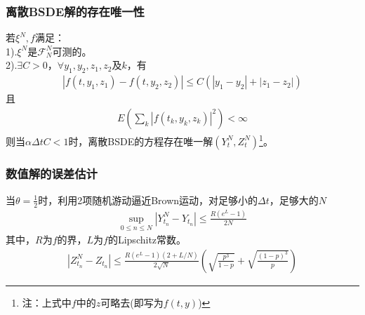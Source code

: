 		\subsubsection{离散BSDE解的存在唯一性}
			若${\xi}^N,f$满足：\\
			1).${\xi}^N$是${{\mathcal{F}}_N^N}$可测的。\\
			2).$\exists C>0$，$\forall y_1,y_2,z_1,z_2$及$k$，有
			\begin{align*}
			\left| {f\left( {t,y_1,{z_1}} \right) - f\left( {t,y_2,{z_2}} \right)} \right| \leqslant C\left( {\left| {{y_1} - {y_2}} \right| + \left| {{z_1} - {z_2}} \right|} \right)
			\end{align*}
			且\begin{align*}
			E\left( {\sum\limits_k {{{\left| {f\left( {{t_k},{y_k},{z_k}} \right)} \right|}^2}} } \right) < \infty
			\end{align*}
			则当$\alpha \Delta tC <1$时，离散BSDE的方程存在唯一解$(Y_t^N,Z_t^N)$\footnote{注：上式中$f$中的$z$可略去(即写为$f(t,y)$)}。
		\subsubsection{数值解的误差估计}
			当$\theta=\frac 12$时，利用2项随机游动逼近Brown运动，对足够小的$\Delta t$，足够大的$N$
			\begin{align*}
			\mathop {\sup }\limits_{0 \leqslant n \leqslant N} \left| {Y_{{t_n}}^N - {Y_{{t_n}}}} \right| \leqslant \frac{{R\left( {{e^L} - 1} \right)}}{{2N}}
			\end{align*}
			其中，$R$为$f$的界，$L$为$f$的Lipschitz常数。
			\begin{align*}
			\left|Z_{t_n}^N - Z_{t_n}\right|\leqslant \frac{R(e^L-1)(2+L/N)}{2\sqrt{N}} \left(\sqrt{\frac{p^3}{1-p}}+\sqrt{\frac{(1-p)^3}{p}} \right)
			\end{align*}
